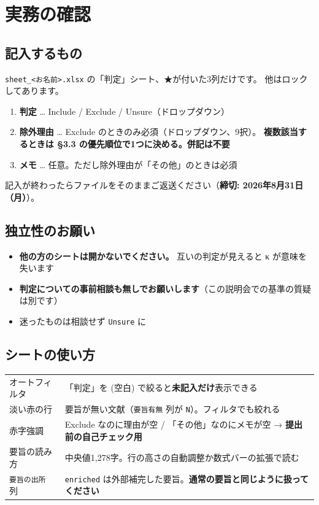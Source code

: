 \documentclass[a4paper]{ltjsarticle}
\newcommand{\rsn}[1]{\texttt{\small #1}}
\begin{document}
\section{実務の確認}

\subsection{記入するもの}

\texttt{sheet\_\textless お名前\textgreater .xlsx} の「判定」シート、★が付いた3列だけです。
他はロックしてあります。

\begin{enumerate}
  \item \textbf{判定} … Include / Exclude / Unsure（ドロップダウン）
  \item \textbf{除外理由} … Exclude のときのみ必須（ドロップダウン、9択）。
        \textbf{複数該当するときは §3.3 の優先順位で1つに決める。併記は不要}
  \item \textbf{メモ} … 任意。ただし除外理由が「その他」のときは必須
\end{enumerate}

\noindent
記入が終わったらファイルをそのままご返送ください（\textbf{締切: 2026年8月31日（月）}）。

\subsection{独立性のお願い}

\begin{itemize}
  \item \textbf{他の方のシートは開かないでください。} 互いの判定が見えると κ が意味を失います
  \item \textbf{判定についての事前相談も無しでお願いします}（この説明会での基準の質疑は別です）
  \item 迷ったものは相談せず \rsn{Unsure} に
\end{itemize}

\subsection{シートの使い方}

\begin{center}
\begin{tabularx}{\linewidth}{L{9em} X}
\toprule
オートフィルタ & 「判定」を (空白) で絞ると\textbf{未記入だけ}表示できる \\
淡い赤の行 & 要旨が無い文献（\texttt{要旨有無} 列が \texttt{N}）。フィルタでも絞れる \\
赤字強調 & Exclude なのに理由が空 / 「その他」なのにメモが空 → \textbf{提出前の自己チェック用} \\
要旨の読み方 & 中央値1,278字。行の高さの自動調整か数式バーの拡張で読む \\
\texttt{要旨の出所} 列 & \texttt{enriched} は外部補完した要旨。\textbf{通常の要旨と同じように扱ってください} \\
\bottomrule
\end{tabularx}
\end{center}
\end{document}
